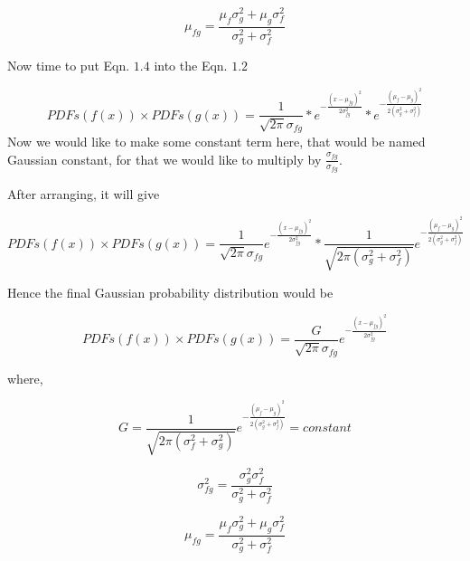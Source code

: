 $$\mu_{fg} = \frac{\mu_f\sigma_g^2 + \mu_g \sigma_f^2 }{\sigma_g^2 + \sigma_f^2}$$

Now time to put Eqn. $1.4$ into the Eqn. $1.2$


$$  PDFs(f(x)) \times PDFs(g(x))  =  \frac{1}{\sqrt{2 \pi} \sigma_{fg}} *  e^{-\frac{(x-\mu_{fg})^2}{2\sigma_{fg}^2}} *  e^{-\frac{(\mu_f-\mu_g)^2}{2(\sigma_g^2 + \sigma_f^2)}}$$
 Now we would like to make some constant term here, that would be named Gaussian constant, for that we would like to multiply by $\frac{\sigma_{fg}}{\sigma_{fg}}$.
 
 After arranging, it will give
 

$$  PDFs(f(x)) \times PDFs(g(x)) = \frac{1}{\sqrt{2\pi}\sigma_{fg} } e^{-\frac{(x-\mu_{fg})^2}{2\sigma_{fg}^2}} *  \frac{1}{\sqrt{2\pi(\sigma_g^2 + \sigma_f^2) }} e^{-\frac{(\mu_f-\mu_g)^2}{2 (\sigma_g^2 + \sigma_f^2)}}$$

Hence the final Gaussian probability distribution would be  

\begin{equation}
    \boxed{ PDFs(f(x)) \times PDFs(g(x)) = \frac{G}{\sqrt{2\pi} \sigma_{fg}} e^{-\frac{(x-\mu_{fg})^2}{2\sigma_{fg}^2}}}
\end{equation}

where, 

$$G = \frac{1}{\sqrt{2 \pi (\sigma_f^2 +\sigma_g^2)}}  e^{- \frac{(\mu_f-\mu_g)^2}{2(\sigma_g^2 +\sigma_f^2 )}} = constant $$

$$\sigma_{fg}^2 = \frac{\sigma_g^2 \sigma_f^2}{\sigma_g^2 + \sigma_f^2}$$


$$\mu_{fg} = \frac{\mu_f\sigma_g^2 + \mu_g \sigma_f^2 }{\sigma_g^2 + \sigma_f^2}$$
